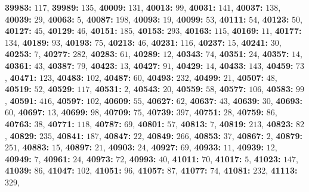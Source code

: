 \textsf{\bfseries 39983:} $117$, \textsf{\bfseries 39989:} $135$, \textsf{\bfseries 40009:} $131$, \textsf{\bfseries 40013:} $99$, \textsf{\bfseries 40031:} $141$, \textsf{\bfseries 40037:} $138$, \textsf{\bfseries 40039:} $29$, \textsf{\bfseries 40063:} $5$, \textsf{\bfseries 40087:} $198$, \textsf{\bfseries 40093:} $19$, \textsf{\bfseries 40099:} $53$, \textsf{\bfseries 40111:} $54$, \textsf{\bfseries 40123:} $50$, \textsf{\bfseries 40127:} $45$, \textsf{\bfseries 40129:} $46$, \textsf{\bfseries 40151:} $185$, \textsf{\bfseries 40153:} $293$, \textsf{\bfseries 40163:} $115$, \textsf{\bfseries 40169:} $11$, \textsf{\bfseries 40177:} $134$, \textsf{\bfseries 40189:} $93$, \textsf{\bfseries 40193:} $75$, \textsf{\bfseries 40213:} $46$, \textsf{\bfseries 40231:} $116$, \textsf{\bfseries 40237:} $15$, \textsf{\bfseries 40241:} $30$, \textsf{\bfseries 40253:} $7$, \textsf{\bfseries 40277:} $282$, \textsf{\bfseries 40283:} $61$, \textsf{\bfseries 40289:} $12$, \textsf{\bfseries 40343:} $74$, \textsf{\bfseries 40351:} $24$, \textsf{\bfseries 40357:} $14$, \textsf{\bfseries 40361:} $43$, \textsf{\bfseries 40387:} $79$, \textsf{\bfseries 40423:} $13$, \textsf{\bfseries 40427:} $91$, \textsf{\bfseries 40429:} $14$, \textsf{\bfseries 40433:} $143$, \textsf{\bfseries 40459:} $73$, \textsf{\bfseries 40471:} $123$, \textsf{\bfseries 40483:} $102$, \textsf{\bfseries 40487:} $60$, \textsf{\bfseries 40493:} $232$, \textsf{\bfseries 40499:} $21$, \textsf{\bfseries 40507:} $48$, \textsf{\bfseries 40519:} $52$, \textsf{\bfseries 40529:} $117$, \textsf{\bfseries 40531:} $2$, \textsf{\bfseries 40543:} $20$, \textsf{\bfseries 40559:} $58$, \textsf{\bfseries 40577:} $106$, \textsf{\bfseries 40583:} $99$, \textsf{\bfseries 40591:} $416$, \textsf{\bfseries 40597:} $102$, \textsf{\bfseries 40609:} $55$, \textsf{\bfseries 40627:} $62$, \textsf{\bfseries 40637:} $43$, \textsf{\bfseries 40639:} $30$, \textsf{\bfseries 40693:} $60$, \textsf{\bfseries 40697:} $13$, \textsf{\bfseries 40699:} $98$, \textsf{\bfseries 40709:} $75$, \textsf{\bfseries 40739:} $397$, \textsf{\bfseries 40751:} $28$, \textsf{\bfseries 40759:} $86$, \textsf{\bfseries 40763:} $38$, \textsf{\bfseries 40771:} $118$, \textsf{\bfseries 40787:} $69$, \textsf{\bfseries 40801:} $57$, \textsf{\bfseries 40813:} $7$, \textsf{\bfseries 40819:} $213$, \textsf{\bfseries 40823:} $82$, \textsf{\bfseries 40829:} $235$, \textsf{\bfseries 40841:} $187$, \textsf{\bfseries 40847:} $22$, \textsf{\bfseries 40849:} $266$, \textsf{\bfseries 40853:} $37$, \textsf{\bfseries 40867:} $2$, \textsf{\bfseries 40879:} $251$, \textsf{\bfseries 40883:} $15$, \textsf{\bfseries 40897:} $21$, \textsf{\bfseries 40903:} $24$, \textsf{\bfseries 40927:} $69$, \textsf{\bfseries 40933:} $11$, \textsf{\bfseries 40939:} $12$, \textsf{\bfseries 40949:} $7$, \textsf{\bfseries 40961:} $24$, \textsf{\bfseries 40973:} $72$, \textsf{\bfseries 40993:} $40$, \textsf{\bfseries 41011:} $70$, \textsf{\bfseries 41017:} $5$, \textsf{\bfseries 41023:} $147$, \textsf{\bfseries 41039:} $86$, \textsf{\bfseries 41047:} $102$, \textsf{\bfseries 41051:} $96$, \textsf{\bfseries 41057:} $87$, \textsf{\bfseries 41077:} $74$, \textsf{\bfseries 41081:} $232$, \textsf{\bfseries 41113:} $329$, 
